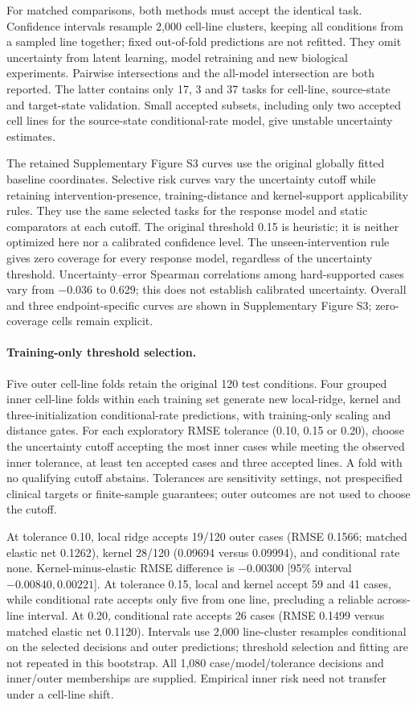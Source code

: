 \documentclass[a4paper,fleqn]{cas-sc}
\begin{document}
For matched comparisons, both methods must accept the identical task. Confidence intervals resample 2,000 cell-line clusters, keeping all conditions from a sampled line together; fixed out-of-fold predictions are not refitted. They omit uncertainty from latent learning, model retraining and new biological experiments. Pairwise intersections and the all-model intersection are both reported. The latter contains only 17, 3 and 37 tasks for cell-line, source-state and target-state validation. Small accepted subsets, including only two accepted cell lines for the source-state conditional-rate model, give unstable uncertainty estimates.

The retained Supplementary Figure S3 curves use the original globally fitted baseline coordinates. Selective risk curves vary the uncertainty cutoff while retaining intervention-presence, training-distance and kernel-support applicability rules. They use the same selected tasks for the response model and static comparators at each cutoff. The original threshold 0.15 is heuristic; it is neither optimized here nor a calibrated confidence level. The unseen-intervention rule gives zero coverage for every response model, regardless of the uncertainty threshold. Uncertainty--error Spearman correlations among hard-supported cases vary from $-0.036$ to 0.629; this does not establish calibrated uncertainty. Overall and three endpoint-specific curves are shown in Supplementary Figure S3; zero-coverage cells remain explicit.

\paragraph{Training-only threshold selection.}
Five outer cell-line folds retain the original 120 test conditions. Four grouped inner cell-line folds within each training set generate new local-ridge, kernel and three-initialization conditional-rate predictions, with training-only scaling and distance gates. For each exploratory RMSE tolerance (0.10, 0.15 or 0.20), choose the uncertainty cutoff accepting the most inner cases while meeting the observed inner tolerance, at least ten accepted cases and three accepted lines. A fold with no qualifying cutoff abstains. Tolerances are sensitivity settings, not prespecified clinical targets or finite-sample guarantees; outer outcomes are not used to choose the cutoff.

At tolerance 0.10, local ridge accepts 19/120 outer cases (RMSE 0.1566; matched elastic net 0.1262), kernel 28/120 (0.09694 versus 0.09994), and conditional rate none. Kernel-minus-elastic RMSE difference is $-0.00300$ [95\% interval $-0.00840,0.00221$]. At tolerance 0.15, local and kernel accept 59 and 41 cases, while conditional rate accepts only five from one line, precluding a reliable across-line interval. At 0.20, conditional rate accepts 26 cases (RMSE 0.1499 versus matched elastic net 0.1120). Intervals use 2,000 line-cluster resamples conditional on the selected decisions and outer predictions; threshold selection and fitting are not repeated in this bootstrap. All 1,080 case/model/tolerance decisions and inner/outer memberships are supplied. Empirical inner risk need not transfer under a cell-line shift.
\end{document}
